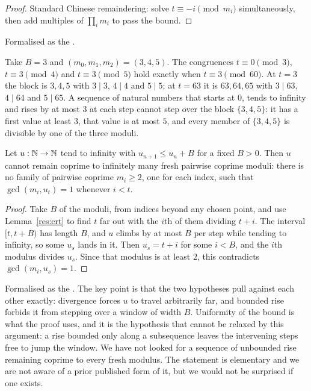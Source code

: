 \documentclass[11pt]{article}
\begin{document}
\begin{proof}
Standard Chinese remaindering: solve $t\equiv-i \pmod{m_i}$ simultaneously,
then add multiples of $\prod_i m_i$ to pass the bound.
\end{proof}

\noindent Formalised as the
.

\begin{example}\label{ex:crt}
Take $B=3$ and $(m_0,m_1,m_2)=(3,4,5)$.  The congruences $t\equiv0\pmod3$,
$t\equiv3\pmod4$ and $t\equiv3\pmod5$ hold exactly when $t\equiv3\pmod{60}$.
At $t=3$ the block is $3,4,5$ with $3\mid3$, $4\mid4$ and $5\mid5$; at $t=63$
it is $63,64,65$ with $3\mid63$, $4\mid64$ and $5\mid65$.  A sequence of
natural numbers that starts at $0$, tends to infinity and rises by at most $3$
at each step cannot step over the block $\{3,4,5\}$: it has a first value at
least $3$, that value is at most $5$, and every member of $\{3,4,5\}$ is
divisible by one of the three moduli.
\end{example}

\begin{theorem}\label{res:barrier}
Let $u:\mathbb{N}\to\mathbb{N}$ tend to infinity with $u_{n+1}\le u_n+B$ for a fixed $B>0$.
Then $u$ cannot remain coprime to infinitely many fresh pairwise coprime
moduli: there is no family of pairwise coprime $m_i\ge2$, one for each index,
such that $\gcd(m_i,u_t)=1$ whenever $i<t$.
\end{theorem}

\begin{proof}
Take $B$ of the moduli, from indices beyond any chosen point, and use
Lemma~\ref{res:crt} to find $t$ far out with the $i$th of them dividing $t+i$.
The interval $[t,t+B)$ has length $B$, and $u$ climbs by at most $B$ per step
while tending to infinity, so some $u_s$ lands in it.  Then $u_s=t+i$ for some
$i<B$, and the $i$th modulus divides $u_s$.  Since that modulus is at least
$2$, this contradicts $\gcd(m_i,u_s)=1$.
\end{proof}

\noindent Formalised as the
.  The key point is that the two hypotheses pull against each other
exactly: divergence forces $u$ to travel arbitrarily far, and bounded rise
forbids it from stepping over a window of width $B$.  Uniformity of the bound
is what the proof uses, and it is the hypothesis that cannot be relaxed by this
argument: a rise bounded only along a subsequence leaves the intervening steps
free to jump the window.  We have not looked for a sequence of unbounded rise
remaining coprime to every fresh modulus.  The statement is elementary and we are not aware of a
prior published form of it, but we would not be surprised if one exists.
\end{document}
